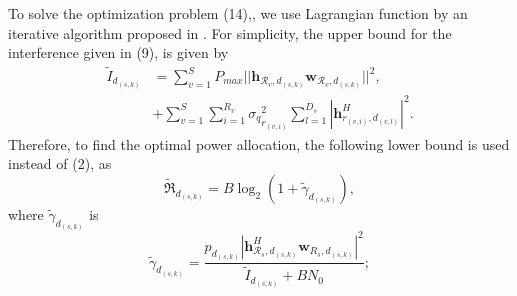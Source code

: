 \documentclass[conference,10pt,twocolumn,letter]{IEEEtran}
\begin{document}
To solve the optimization problem (14),, we use Lagrangian function  by an iterative algorithm proposed in \cite{11}.
For simplicity, the upper bound for the interference given in (9), is given by
\begin{equation}
\begin{split}
\tilde{I}_{d_{(s,k)}} &= \sum_{v=1}^{S} P_{max}|| \boldsymbol{h}_{\mathcal{R}_v,d_{(s,k)}} \boldsymbol{w}_{\mathcal{R}_v,d_{(s,k)}}||^2 ,\\
& +  \sum_{v=1}^{S} \sum_{i=1}^{{R}_v} {\sigma_q}_{r_{(v,i)}}^2 \sum_{l=1}^{{D}_s} |\boldsymbol{h}_{r_{(v,i)}, d_{(v,l)}}^H|^2.
\end{split}
\end{equation}
Therefore, to find the optimal power allocation, the following lower bound is used instead of (2), as
\begin{equation}\label{e11}
\mathfrak{\tilde{R}}_{d_{(s,k)}} = B \log_2(1+\tilde{\gamma}_{d_{(s,k)}}),
\end{equation}
where $\tilde{\gamma}_{d_{(s,k)}}$ is
\begin{equation}\label{15}
\tilde{\gamma}_{d_{(s,k)}} =  \frac{p_{d_{(s,k)}}|\boldsymbol{h}_{\mathcal{R}_s, d_{(s,k)}}^H \boldsymbol{w}_{R_{s},d_{(s,k)}}|^2}{\tilde{I}_{d_{(s,k)}}+BN_0};
\end{equation}
\end{document}
